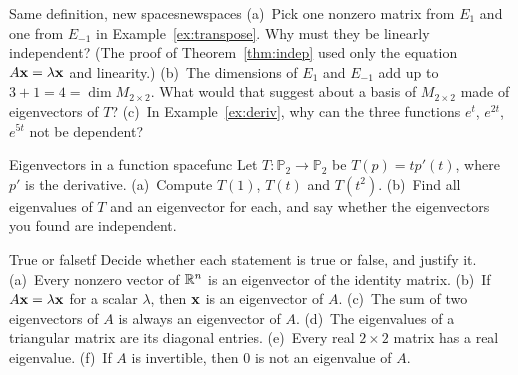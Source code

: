 \documentclass[11pt]{article}
\begin{document}
\begin{think}{Same definition, new spaces}{newspaces}
(a)~Pick one nonzero matrix from $E_1$ and one from $E_{-1}$ in Example~\ref{ex:transpose}. Why must they be linearly independent? (The proof of Theorem~\ref{thm:indep} used only the equation $A\mathbf{x}=\lambda\mathbf{x}$ and linearity.) (b)~The dimensions of $E_1$ and $E_{-1}$ add up to $3+1=4=\dim M_{2\times2}$. What would that suggest about a basis of $M_{2\times2}$ made of eigenvectors of $T$? (c)~In Example~\ref{ex:deriv}, why can the three functions $e^{t}$, $e^{2t}$, $e^{5t}$ not be dependent?
\end{think}

\begin{kc}{Eigenvectors in a function space}{func}
Let $T:\mathbb{P}_2\to\mathbb{P}_2$ be $T(p)=tp'(t)$, where $p'$ is the derivative. (a)~Compute $T(1)$, $T(t)$ and $T(t^2)$. (b)~Find all eigenvalues of $T$ and an eigenvector for each, and say whether the eigenvectors you found are independent.
\end{kc}

\begin{kc}{True or false}{tf}
Decide whether each statement is true or false, and justify it. (a)~Every nonzero vector of $\mathbb{R}^n$ is an eigenvector of the identity matrix. (b)~If $A\mathbf{x}=\lambda\mathbf{x}$ for a scalar $\lambda$, then $\mathbf{x}$ is an eigenvector of $A$. (c)~The sum of two eigenvectors of $A$ is always an eigenvector of $A$. (d)~The eigenvalues of a triangular matrix are its diagonal entries. (e)~Every real $2\times2$ matrix has a real eigenvalue. (f)~If $A$ is invertible, then $0$ is not an eigenvalue of $A$.
\end{kc}
\end{document}
